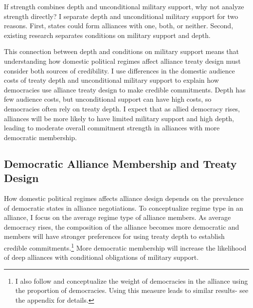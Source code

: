\documentclass[12pt]{article}
\begin{document}
If strength combines depth and unconditional military support, why not analyze strength directly? 
I separate depth and unconditional military support for two reasons. 
First, states could form alliances with one, both, or neither.  
Second, existing research separates conditions on military support and depth. 


This connection between depth and conditions on military support means that understanding how domestic political regimes affect alliance treaty design must consider both sources of credibility.  
I use differences in the domestic audience costs of treaty depth and unconditional military support to explain how democracies use alliance treaty design to make credible commitments. 
Depth has few audience costs, but unconditional support can have high costs, so democracies often rely on treaty depth. 
I expect that as allied democracy rises, alliances will be more likely to have limited military support and high depth, leading to moderate overall commitment strength in alliances with more democratic membership. 


\subsection{Democratic Alliance Membership and Treaty Design}


How domestic political regimes affects alliance design depends on the prevalence of democratic states in alliance negotiations. 
To conceptualize regime type in an alliance, I focus on the average regime type of alliance members. 
As average democracy rises, the composition of the alliance becomes more democratic and members will have stronger preferences for using treaty depth to establish credible commitments.\footnote{I also follow \citet{Chibaetal2015} and conceptualize the weight of democracies in the alliance using the proportion of democracies. Using this measure leads to similar results- see the appendix for details.} 
More democratic membership will increase the likelihood of deep alliances with conditional obligations of military support. 
\end{document}
